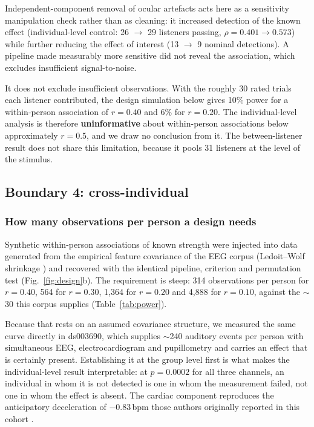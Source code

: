 Independent-component removal of ocular artefacts acts here as a sensitivity
manipulation check rather than as cleaning: it increased detection of the
known effect (individual-level control: 26 $\rightarrow$ 29 listeners passing,
$\rho = 0.401 \rightarrow 0.573$) while further reducing the effect of
interest (13 $\rightarrow$ 9 nominal detections). A pipeline made measurably
more sensitive did not reveal the association, which excludes insufficient
signal-to-noise.

It does not exclude insufficient observations. With the roughly 30 rated
trials each listener contributed, the design simulation below gives 10\% power
for a within-person association of $r = 0.40$ and 6\% for $r = 0.20$. The
individual-level analysis is therefore \textbf{uninformative} about
within-person associations below approximately $r = 0.5$, and we draw no
conclusion from it. The between-listener result does not share this
limitation, because it pools 31 listeners at the level of the stimulus.

\subsection{Boundary 4: cross-individual}
\label{sec:individual}

\subsubsection{How many observations per person a design needs}

Synthetic within-person associations of known strength were injected into data
generated from the empirical feature covariance of the EEG corpus
(Ledoit--Wolf shrinkage \cite{ledoit2004}) and recovered with the identical
pipeline, criterion and permutation test (Fig.~\ref{fig:design}b). The
requirement is steep: 314 observations per person for $r = 0.40$, 564 for
$r = 0.30$, 1{,}364 for $r = 0.20$ and 4{,}888 for $r = 0.10$, against the
$\sim$30 this corpus supplies (Table~\ref{tab:power}).

Because that rests on an assumed covariance structure, we measured the same
curve directly in ds003690, which supplies $\sim$240 auditory events per
person with simultaneous EEG, electrocardiogram and pupillometry and carries
an effect that is certainly present. Establishing it at the group level first
is what makes the individual-level result interpretable: at $p = 0.0002$ for
all three channels, an individual in whom it is not detected is one in whom
the measurement failed, not one in whom the effect is absent. The cardiac
component reproduces the anticipatory deceleration of $-0.83$\,bpm those
authors originally reported in this cohort \cite{ribeiro2019cardiac}.

